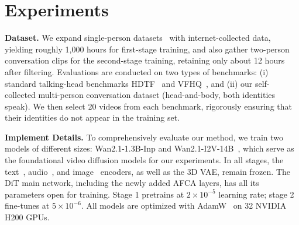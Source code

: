 \section{Experiments}
\label{sec:exp}


\noindent \textbf{Dataset.} 
We expand single-person datasets~\cite{zhang2021flow, xie2022vfhq, cui2025hallo3, zhu2022celebv, chung2018voxceleb2} with internet-collected data, yielding roughly 1,000 hours for first-stage training, and also gather two-person conversation clips for the second-stage training, retaining only about 12 hours after filtering.
Evaluations are conducted on two types of benchmarks: (i) standard talking-head benchmarks HDTF~\cite{zhang2021flow} and VFHQ~\cite{xie2022vfhq}, and (ii) our self-collected multi-person conversation dataset (head-and-body, both identities speak).  
We then select 20 videos from each benchmark, rigorously ensuring that their identities do not appear in the training set.

\label{subsec:metric}

\noindent \textbf{Implement Details.}
To comprehensively evaluate our method, we train two models of different sizes: Wan2.1-1.3B-Inp and Wan2.1-I2V-14B~\cite{wan2025wan}, which serve as the foundational video diffusion models for our experiments. 
In all stages, the text~\cite{raffel2020exploring}, audio~\cite{baevski2020wav2vec}, and image~\cite{radford2021learning} encoders, as well as the 3D VAE, remain frozen.
The DiT main network, including the newly added AFCA layers, has all its parameters open for training. 
Stage 1 pretrains at $2 \times 10^{-5}$ learning rate; stage 2 fine-tunes at $5 \times 10^{-6}$.
All models are optimized with AdamW~\cite{loshchilov2017decoupled} on 32 NVIDIA H200 GPUs.

